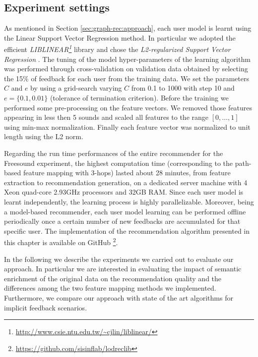 \subsection{Experiment settings}
As mentioned in Section \ref{sec:graph-rec:approach}, each user model is learnt using the Linear Support Vector Regression method. In particular we adopted the efficient \textit{LIBLINEAR\footnote{\url{http://www.csie.ntu.edu.tw/~cjlin/liblinear/}}} library and chose the \textit{L2-regularized Support Vector Regression} \cite{HoL12}. 
The tuning of the model hyper-parameters of the learning algorithm was performed through cross-validation on validation data obtained by selecting the 15\% of feedback for each user from the training data. We set the parameters $C$ and $e$ by using a grid-search varying $C$ from 0.1 to 1000 with step 10 and $e=\lbrace 0.1,0.01 \rbrace$ (tolerance of termination criterion). Before the training we performed some pre-processing on the feature vectors. We removed those features appearing in less then 5  sounds and scaled all features to the range $[0,\ldots,1]$ using min-max normalization. Finally each feature vector was normalized to unit length using the L2 norm.

Regarding the run time performances of the entire recommender for the Freesound experiment, the highest computation time (corresponding to the path-based feature mapping with 3-hops) lasted about 28 minutes, from feature extraction to recommendation generation, on a dedicated server machine with 4 Xeon quad-core 2.93GHz processors and 32GB RAM. 
Since each user model is learnt independently, the learning process is highly parallelizable.  Moreover, being a model-based recommender, each user model learning can be performed offline periodically once a certain number of new feedbacks are accumulated for that specific user. 
The implementation of the recommendation algorithm presented in this chapter is available on GitHub \footnote{\url{https://github.com/sisinflab/lodreclib}}.

In the following we describe the experiments we carried out to evaluate our approach. In particular we are interested in evaluating the impact of semantic enrichment of the original data on the recommendation quality and the differences among the two feature mapping methods we implemented. Furthermore, we compare our approach with state of the art algorithms for implicit feedback scenarios. 

